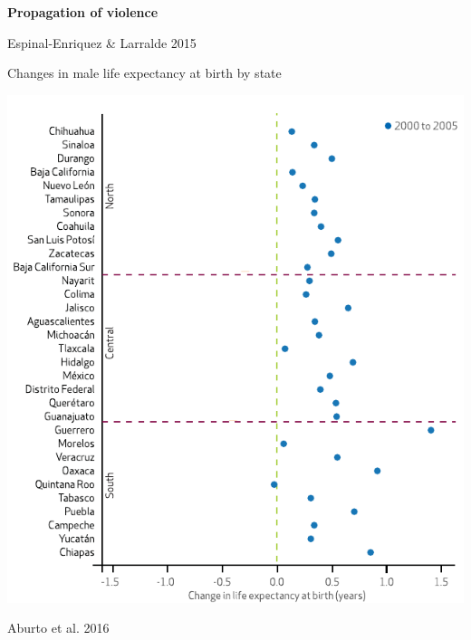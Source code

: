 \documentclass[xcolor={dvipsnames}]{beamer}
\begin{document}
\begin{frame}
	\huge{
	\begin{center}
		\bf{Propagation of violence}\linebreak
	\end{center}
		}

	\begin{center}		
	\end{center}

	\tiny{Espinal-Enriquez \& Larralde 2015}
\end{frame}



\begin{frame}
	\Large{Changes in male life expectancy at birth by state}


	\begin{center}
		\includegraphics[scale=.66]{Figures/Changes_states_1}
	\end{center}
	
	\tiny{Aburto et al. 2016}				
\end{frame}
\end{document}

